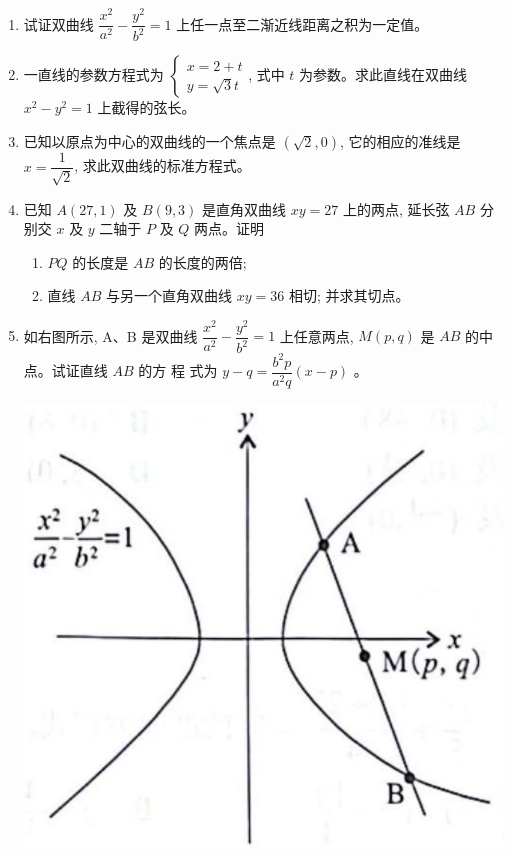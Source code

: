 \documentclass[10pt]{article}
\begin{document}
\begin{enumerate}
  \item 试证双曲线 $\dfrac{x^{2}}{a^{2}}-\dfrac{y^{2}}{b^{2}}=1$ 上任一点至二渐近线距离之积为一定值。
  \item 一直线的参数方程式为 $\left\{\begin{array}{l}x=2+t \\ y=\sqrt{3} t\end{array}\right.$, 式中 $t$ 为参数。求此直线在双曲线 $x^{2}-y^{2}=1$ 上截得的弦长。
  \item 已知以原点为中心的双曲线的一个焦点是 $(\sqrt{2}, 0)$, 它的相应的准线是 $x=\dfrac{1}{\sqrt{2}}$, 求此双曲线的标准方程式。
  \item 已知 $A(27,1)$ 及 $B(9,3)$ 是直角双曲线 $x y=27$ 上的两点, 延长弦 $AB$ 分别交 $x$ 及 $y$ 二轴于 $P$ 及 $Q$ 两点。证明
  \begin{enumerate}
    \item $PQ$ 的长度是 $AB$ 的长度的两倍;
    \item 直线 $AB$ 与另一个直角双曲线 $x y=36$ 相切; 并求其切点。
  \end{enumerate}
  \item 如右图所示, A、B 是双曲线 $\dfrac{x^{2}}{a^{2}}-\dfrac{y^{2}}{b^{2}}=1$ 上任意两点, $M(p, q)$ 是 $AB$ 的中点。试证直线 $AB$ 的方 程 式为 $y-q=\dfrac{b^{2} p}{a^{2} q}(x-p)$ 。

\begin{center}
\includegraphics[max width=\textwidth]{2024_06_05_971e6815482d5ecd2718g-34}
\end{center}


\end{enumerate}
\end{document}
